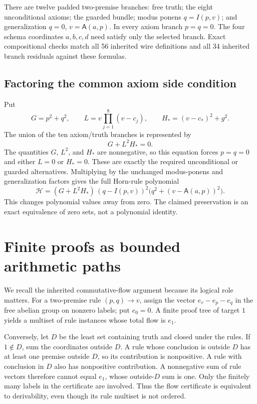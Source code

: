\documentclass[11pt,letterpaper]{article}
\theoremstyle{definition}\newtheorem{definition}[theorem]{Definition}
\theoremstyle{remark}\newtheorem{remark}[theorem]{Remark}
\begin{document}
There are twelve padded two-premise branches: free truth; the eight
unconditional axioms; the guarded bundle; modus ponens $q=I(p,v)$;
and generalization $q=0$, $v=\mathsf A(a,p)$. In every axiom branch
$p=q=0$. The four schema coordinates $a,b,c,d$ need satisfy only the
selected branch. Exact compositional checks match all 56 inherited wire
definitions and all 34 inherited branch residuals against these formulas.

\subsection{Factoring the common axiom side condition}

Put
\[
 G=p^2+q^2,\qquad
 L=v\prod_{j=1}^{8}(v-c_j),\qquad
 H_*=(v-c_*)^2+g^2.
\]
The union of the ten axiom/truth branches is represented by
\begin{equation}\label{eq:factored-axiom}
 G+L^2H_*=0.
\end{equation}
The quantities $G$, $L^2$, and $H_*$ are nonnegative, so this equation forces
$p=q=0$ and either $L=0$ or $H_*=0$. These are exactly the required
unconditional or guarded alternatives. Multiplying by the unchanged
modus-ponens and generalization factors gives the full Horn-rule
polynomial
\begin{equation}\label{eq:horn}
 \mathcal H=(G+L^2H_*)\,(q-I(p,v))^2
 \bigl(q^2+(v-\mathsf A(a,p))^2\bigr).
\end{equation}
This changes polynomial values away from zero. The claimed preservation
is an exact equivalence of zero sets, not a polynomial identity.

\section{Finite proofs as bounded arithmetic paths}
\label{sec:paths}

We recall the inherited commutative-flow argument because its logical
role matters. For a two-premise rule $(p,q)\to v$, assign the vector
$e_v-e_p-e_q$ in the free abelian group on nonzero labels; put $e_0=0$.
A finite proof tree of target $1$ yields a multiset of rule instances
whose total flow is $e_1$.

Conversely, let $D$ be the least set containing truth and closed under the
rules. If $1\notin D$, sum the coordinates outside $D$. A rule whose
conclusion is outside $D$ has at least one premise outside $D$, so its
contribution is nonpositive. A rule with conclusion in $D$ also has
nonpositive contribution. A nonnegative sum of rule vectors therefore
cannot equal $e_1$, whose outside-$D$ sum is one. Only the finitely many
labels in the certificate are involved. Thus the flow certificate is
equivalent to derivability, even though its rule multiset is not ordered.
\end{document}
